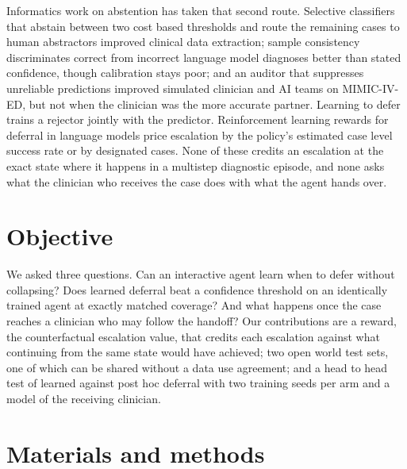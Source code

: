 \documentclass[11pt]{article}
\begin{document}
Informatics work on abstention has taken that second route. Selective classifiers that abstain between two cost based thresholds and route the remaining cases to human abstractors improved clinical data extraction\cite{swaminathan2024}; sample consistency discriminates correct from incorrect language model diagnoses better than stated confidence, though calibration stays poor\cite{savage2025}; and an auditor that suppresses unreliable predictions improved simulated clinician and AI teams on MIMIC-IV-ED, but not when the clinician was the more accurate partner\cite{brown2026}. Learning to defer trains a rejector jointly with the predictor\cite{mozannar2020,madras2018,dvijotham2023}. Reinforcement learning rewards for deferral in language models price escalation by the policy's estimated case level success rate\cite{tiar,karl,awarl} or by designated cases\cite{trustmed}. None of these credits an escalation at the exact state where it happens in a multistep diagnostic episode, and none asks what the clinician who receives the case does with what the agent hands over.

\section*{Objective}

We asked three questions. Can an interactive agent learn when to defer without collapsing? Does learned deferral beat a confidence threshold on an identically trained agent at exactly matched coverage? And what happens once the case reaches a clinician who may follow the handoff? Our contributions are a reward, the counterfactual escalation value, that credits each escalation against what continuing from the same state would have achieved; two open world test sets, one of which can be shared without a data use agreement; and a head to head test of learned against post hoc deferral with two training seeds per arm and a model of the receiving clinician.

\section*{Materials and methods}
\end{document}
